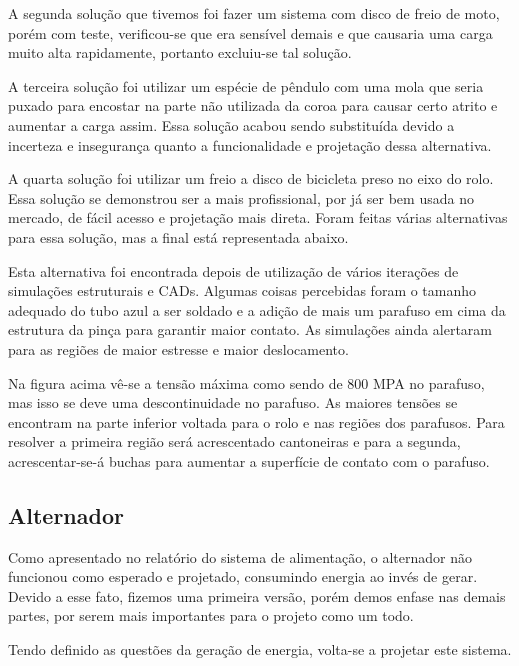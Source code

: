     A segunda solução que tivemos foi fazer um sistema com disco de freio de moto, porém com teste, verificou-se que era sensível demais e que causaria uma carga muito alta rapidamente, portanto excluiu-se tal solução.


    A terceira solução foi utilizar um espécie de pêndulo com uma mola que seria puxado para encostar na parte não utilizada da coroa para causar certo atrito e aumentar a carga assim. Essa solução acabou sendo substituída devido a incerteza e insegurança quanto a funcionalidade e projetação dessa alternativa.


    A quarta solução foi utilizar um freio a disco de bicicleta preso no eixo do rolo. Essa solução se demonstrou ser a mais profissional, por já ser bem usada no mercado, de fácil acesso e projetação mais direta. Foram feitas várias alternativas para essa solução, mas a final está representada abaixo.


    Esta alternativa foi encontrada depois de utilização de vários iterações de simulações estruturais e CADs. Algumas coisas percebidas foram o tamanho adequado do tubo azul a ser soldado e a adição de mais um parafuso em cima da estrutura da pinça para garantir maior contato.  As simulações ainda alertaram para as regiões de maior estresse e maior deslocamento.


    Na figura acima vê-se a tensão máxima como sendo de 800 MPA no parafuso, mas isso se deve uma descontinuidade no parafuso. As maiores tensões se encontram na parte inferior voltada para o rolo e nas regiões dos parafusos. Para resolver a primeira região será acrescentado cantoneiras e para a segunda, acrescentar-se-á buchas para aumentar a superfície de contato com o parafuso.

\subsection{Alternador}
    Como apresentado no relatório do sistema de alimentação, o alternador não funcionou como esperado e projetado, consumindo energia ao invés de gerar. Devido a esse fato, fizemos uma primeira versão, porém demos enfase nas demais partes, por serem mais importantes para o projeto como um todo.

    
    Tendo definido as questões da geração de energia, volta-se a projetar este sistema.
